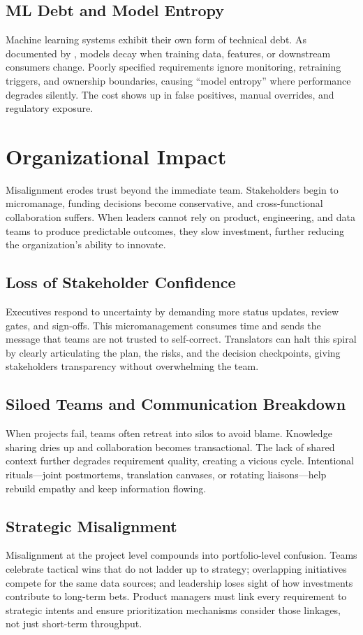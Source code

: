 \subsection{ML Debt and Model Entropy}
Machine learning systems exhibit their own form of technical debt. As documented by \textcite{sculley2015hidden}, models decay when training data, features, or downstream consumers change. Poorly specified requirements ignore monitoring, retraining triggers, and ownership boundaries, causing ``model entropy'' where performance degrades silently. The cost shows up in false positives, manual overrides, and regulatory exposure.

\section{Organizational Impact}
\label{sec:organizational-impact}

Misalignment erodes trust beyond the immediate team. Stakeholders begin to micromanage, funding decisions become conservative, and cross-functional collaboration suffers. When leaders cannot rely on product, engineering, and data teams to produce predictable outcomes, they slow investment, further reducing the organization's ability to innovate.

\subsection{Loss of Stakeholder Confidence}
Executives respond to uncertainty by demanding more status updates, review gates, and sign-offs. This micromanagement consumes time and sends the message that teams are not trusted to self-correct. Translators can halt this spiral by clearly articulating the plan, the risks, and the decision checkpoints, giving stakeholders transparency without overwhelming the team.

\subsection{Siloed Teams and Communication Breakdown}
When projects fail, teams often retreat into silos to avoid blame. Knowledge sharing dries up and collaboration becomes transactional. The lack of shared context further degrades requirement quality, creating a vicious cycle. Intentional rituals---joint postmortems, translation canvases, or rotating liaisons---help rebuild empathy and keep information flowing.

\subsection{Strategic Misalignment}
Misalignment at the project level compounds into portfolio-level confusion. Teams celebrate tactical wins that do not ladder up to strategy; overlapping initiatives compete for the same data sources; and leadership loses sight of how investments contribute to long-term bets. Product managers must link every requirement to strategic intents and ensure prioritization mechanisms consider those linkages, not just short-term throughput.

